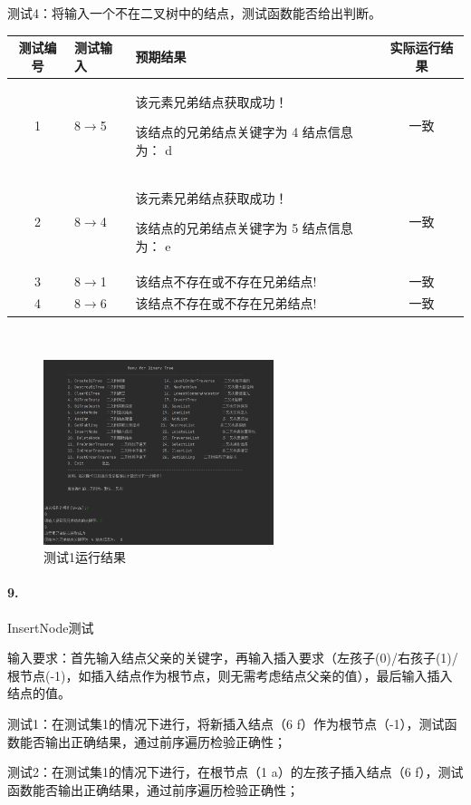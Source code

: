 \documentclass[supercite]{Experimental_Report}
\theoremstyle{definition}
\begin{document}
测试4：将输入一个不在二叉树中的结点，测试函数能否给出判断。

\vspace{0.5em}

\begin{tabular}{|c|l|p{7cm}|c|}
	\hline
	测试编号 & 测试输入 & 预期结果 & 实际运行结果 \\
	\hline
	1 & 8$\rightarrow$5 & 该元素兄弟结点获取成功！

该结点的兄弟结点关键字为 4 结点信息为： d & 一致 \\
	\hline
	2 & 8$\rightarrow$4 & 该元素兄弟结点获取成功！

该结点的兄弟结点关键字为 5 结点信息为： e & 一致 \\
	\hline
	3 & 8$\rightarrow$1 & 该结点不存在或不存在兄弟结点! & 一致 \\
	\hline
	4 & 8$\rightarrow$6 & 该结点不存在或不存在兄弟结点! & 一致 \\
	\hline
\end{tabular}

~\

\begin{figure}[H]
 	\centering
 	\includegraphics[width=0.6\textwidth]{images/二叉树测试8.png}
 	\caption{测试1运行结果}
 	\label{txlab}
 \end{figure}

\paragraph{ 9.}InsertNode测试

输入要求：首先输入结点父亲的关键字，再输入插入要求（左孩子(0)/右孩子(1)/根节点(-1)，如插入结点作为根节点，则无需考虑结点父亲的值），最后输入插入结点的值。

测试1：在测试集1的情况下进行，将新插入结点（6 f）作为根节点（-1），测试函数能否输出正确结果，通过前序遍历检验正确性；

测试2：在测试集1的情况下进行，在根节点（1 a）的左孩子插入结点（6 f），测试函数能否输出正确结果，通过前序遍历检验正确性；
\end{document}
